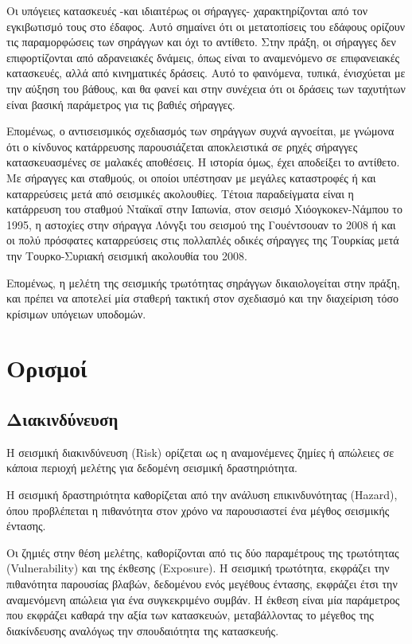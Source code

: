 Οι υπόγειες κατασκευές -και ιδιαιτέρως οι σήραγγες- χαρακτηρίζονται από τον εγκιβωτισμό τους στο έδαφος. Αυτό σημαίνει ότι οι μετατοπίσεις του εδάφους ορίζουν τις παραμορφώσεις των σηράγγων και όχι το αντίθετο. Στην πράξη, οι σήραγγες δεν επιφορτίζονται από αδρανειακές δνάμεις, όπως είναι το αναμενόμενο σε επιφανειακές κατασκευές, αλλά από κινηματικές δράσεις. Αυτό το φαινόμενα, τυπικά, ένισχύεται με την αύξηση του βάθους, και θα φανεί και στην συνέχεια ότι οι δράσεις των ταχυτήτων είναι βασική παράμετρος για τις βαθιές σήραγγες.

Επομένως, ο αντισεισμικός σχεδιασμός των σηράγγων συχνά αγνοείται, με γνώμονα ότι ο κίνδυνος κατάρρευσης παρουσιάζεται αποκλειστικά σε ρηχές σήραγγες κατασκευασμένες σε μαλακές αποθέσεις. Η ιστορία όμως, έχει αποδείξει το αντίθετο. Με σήραγγες και σταθμούς, οι οποίοι υπέστησαν με μεγάλες καταστροφές ή και καταρρεύσεις μετά από σεισμικές ακολουθίες. Τέτοια παραδείγματα είναι η κατάρρευση του σταθμού Νταϊκαϊ στην Ιαπωνία, στον σεισμό Χιόογκοκεν-Νάμπου το 1995, η αστοχίες στην σήραγγα Λόνγξι του σεισμού της Γουέντσουαν το 2008 ή και οι πολύ πρόσφατες καταρρεύσεις στις πολλαπλές οδικές σήραγγες της Τουρκίας μετά την Τουρκο-Συριακή σεισμική ακολουθία του 2008.

Επομένως, η μελέτη της σεισμικής τρωτότητας σηράγγων δικαιολογείται στην πράξη, και πρέπει να αποτελεί μία σταθερή τακτική στον σχεδιασμό και την διαχείριση τόσο κρίσιμων υπόγειων υποδομών.

\section{Ορισμοί}
\subsection{Διακινδύνευση}
\label{Sbsec:Haz}
Η σεισμική διακινδύνευση (Risk) ορίζεται ως η αναμονέμενες ζημίες ή απώλειες σε κάποια περιοχή μελέτης για δεδομένη σεισμική δραστηριότητα.

Η σεισμική δραστηριότητα καθορίζεται από την ανάλυση επικινδυνότητας (Hazard), όπου προβλέπεται η πιθανότητα στον χρόνο να παρουσιαστεί ένα μέγθος σεισμικής έντασης.

Οι ζημιές στην θέση μελέτης, καθορίζονται από τις δύο παραμέτρους της τρωτότητας (Vulnerability) και της έκθεσης (Exposure). Η σεισμική τρωτότητα, εκφράζει την πιθανότητα παρουσίας βλαβών, δεδομένου ενός μεγέθους έντασης, εκφράζει έτσι την αναμενόμενη απώλεια για ένα συγκεκριμένο συμβάν. Η έκθεση είναι μία παράμετρος που εκφράζει καθαρά την αξία των κατασκευών, μεταβάλλοντας το μέγεθος της διακίνδευσης αναλόγως την σπουδαιότητα της κατασκευής. \parencite{Pitilakis}


